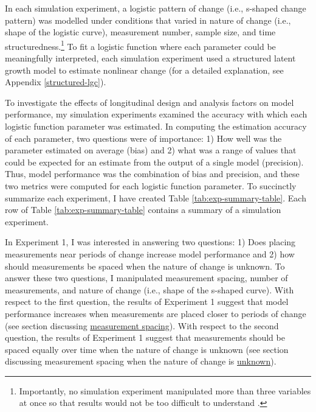 \documentclass[
12pt, %
twoside,
english]{guelphthesis}
\begin{document}
In each simulation experiment, a logistic pattern of change (i.e., s-shaped change pattern) was modelled under conditions that varied in nature of change (i.e., shape of the logistic curve), measurement number, sample size, and time structuredness.\footnote{Importantly, no simulation experiment manipulated more than three variables at once so that results would not be too difficult to understand \parencite{halford2005}.} To fit a logistic function where each parameter could be meaningfully interpreted, each simulation experiment used a structured latent growth model to estimate nonlinear change (for a detailed explanation, see Appendix \ref{structured-lgc}).

To investigate the effects of longitudinal design and analysis factors on model performance, my simulation experiments examined the accuracy with which each logistic function parameter was estimated. In computing the estimation accuracy of each parameter, two questions were of importance: 1) How well was the parameter estimated on average (bias) and 2) what was a range of values that could be expected for an estimate from the output of a single model (precision). Thus, model performance was the combination of bias and precision, and these two metrics were computed for each logistic function parameter. To succinctly summarize each experiment, I have created Table \ref{tab:exp-summary-table}. Each row of Table \ref{tab:exp-summary-table} contains a summary of a simulation experiment.

In Experiment 1, I was interested in answering two questions: 1) Does placing measurements near periods of change increase model performance and 2) how should measurements be spaced when the nature of change is unknown. To answer these two questions, I manipulated measurement spacing, number of measurements, and nature of change (i.e., shape of the s-shaped curve). With respect to the first question, the results of Experiment 1 suggest that model performance increases when measurements are placed closer to periods of change (see section discussing \protect\hyperlink{meas-placing}{measurement spacing}). With respect to the second question, the results of Experiment 1 suggest that measurements should be spaced equally over time when the nature of change is unknown (see section discussing measurement spacing when the nature of change is \protect\hyperlink{unknown}{unknown}).
\end{document}
